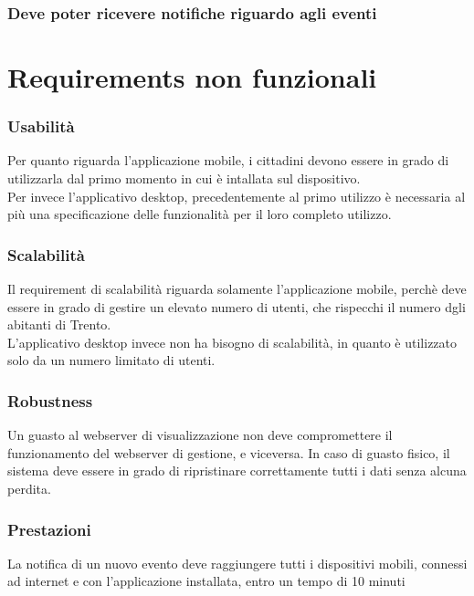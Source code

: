 \documentclass{article}
\begin{document}
\subsubsection{Deve poter ricevere notifiche riguardo agli eventi}

\clearpage

\section{Requirements non funzionali}

\subsubsection{Usabilità}
Per quanto riguarda l'applicazione mobile, i cittadini devono essere in grado di utilizzarla dal primo momento in cui è intallata sul dispositivo.\\
Per invece l'applicativo desktop, precedentemente al primo utilizzo è necessaria al più una specificazione delle funzionalità per il loro completo utilizzo.\\

\subsubsection{Scalabilità}
Il requirement di scalabilità riguarda solamente l'applicazione mobile, perchè deve essere in grado di gestire un elevato numero di utenti, che rispecchi il numero dgli abitanti di Trento.\\
L'applicativo desktop invece non ha bisogno di scalabilità, in quanto è utilizzato solo da un numero limitato di utenti.

\subsubsection{Robustness}
Un guasto al webserver di visualizzazione non deve compromettere il funzionamento del webserver di gestione, e viceversa.
In caso di guasto fisico, il sistema deve essere in grado di ripristinare correttamente tutti i dati senza alcuna perdita. 

\subsubsection{Prestazioni}
La notifica di un nuovo evento deve raggiungere tutti i dispositivi mobili, connessi ad internet e con l'applicazione installata, entro un tempo di 10 minuti
\end{document}
